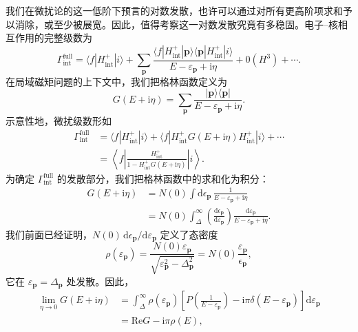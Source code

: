我们在微扰论的这一低阶下预言的对数发散，也许可以通过对所有更高阶项求和予以消除，或至少被展宽。因此，值得考察这一对数发散究竟有多稳固。电子–核相互作用的完整级数为
\begin{equation*}
\Gamma_{\mathrm{int}}^{\mathrm{full}}=\langle f|H_{\mathrm{int}}^{+}|i\rangle+\sum_{\mathbf{p}}\frac{\langle f|H_{\mathrm{int}}^{+}|\mathbf{p}\rangle\langle\mathbf{p}|H_{\mathrm{int}}^{+}|i\rangle}{E-\varepsilon_{\mathbf{p}}+\mathrm{i}\eta}+0(H^{3})+\cdots.\tag{12.311}
\end{equation*}
在局域磁矩问题的上下文中，我们把格林函数定义为
\begin{equation*}
G(E+\mathrm{i}\eta)=\sum_{\mathbf{p}}\frac{|\mathbf{p}\rangle\langle\mathbf{p}|}{E-\varepsilon_{\mathbf{p}}+\mathrm{i}\eta}.\tag{12.312}
\end{equation*}
示意性地，微扰级数形如
\begin{align*}
\Gamma_{\mathrm{int}}^{\mathrm{full}}&=\langle f|H_{\mathrm{int}}^{+}|i\rangle+\langle f|H_{\mathrm{int}}^{+}G\left(E+\mathrm{i}\eta\right)H_{\mathrm{int}}^{+}|i\rangle+\cdots\\
&=\left\langle f\left|\frac{H_{\mathrm{int}}^{+}}{1-H_{\mathrm{int}}^{+}G\left(E+\mathrm{i}\eta\right)}\right|i\right\rangle.\tag{12.313}
\end{align*}
为确定 $\Gamma_{\mathrm{int}}^{\mathrm{full}}$ 的发散部分，我们把格林函数中的求和化为积分：
\begin{align*}
G\left(E+\mathrm{i}\eta\right)&=N(0)\int\mathrm{d}\epsilon_{\mathbf{p}}\,\frac{1}{E-\varepsilon_{\mathbf{p}}+\mathrm{i}\eta}\\
&=N(0)\int_{\Delta}^{\infty}\left(\frac{\mathrm{d}\epsilon_{\mathbf{p}}}{\mathrm{d}\varepsilon_{\mathbf{p}}}\right)\frac{\mathrm{d}\varepsilon_{\mathbf{p}}}{E-\varepsilon_{\mathbf{p}}+\mathrm{i}\eta}.\tag{12.314}
\end{align*}
我们前面已经证明，$N(0)\,\mathrm{d}\epsilon_{\mathbf{p}}/\mathrm{d}\varepsilon_{\mathbf{p}}$ 定义了态密度
\begin{equation*}
\rho\left(\varepsilon_{\mathbf{p}}\right)=\frac{N(0)\varepsilon_{\mathbf{p}}}{\sqrt{\varepsilon_{\mathbf{p}}^{2}-\Delta_{\mathbf{p}}^{2}}}=N(0)\frac{\varepsilon_{\mathbf{p}}}{\epsilon_{\mathbf{p}}},\tag{12.315}
\end{equation*}
它在 $\varepsilon_{\mathbf{p}}=\Delta_{\mathbf{p}}$ 处发散。因此，
\begin{align*}
\lim_{\eta\to 0}G(E+\mathrm{i}\eta)&=\int_{\Delta}^{\infty}\rho(\varepsilon_{\mathbf{p}})\left[P\left(\frac{1}{E-\varepsilon_{\mathbf{p}}}\right)-\mathrm{i}\pi\delta\left(E-\varepsilon_{\mathbf{p}}\right)\right]\mathrm{d}\varepsilon_{\mathbf{p}}\\
&=\mathrm{Re}G-\mathrm{i}\pi\rho(E),\tag{12.316}
\end{align*}
